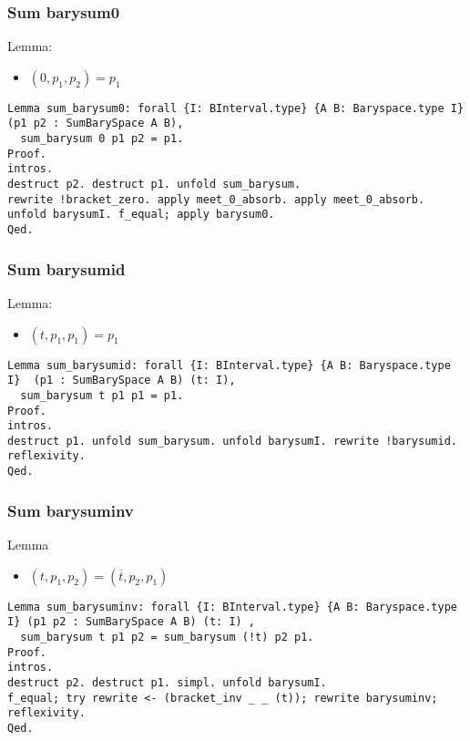 \documentclass[a4paper,10pt]{article} %
\begin{document}
\subsubsection{Sum barysum0}
Lemma:
\begin{itemize}
    \item $(0, p_1, p_2) = p_1$
\end{itemize}
\begin{lstlisting}
Lemma sum_barysum0: forall {I: BInterval.type} {A B: Baryspace.type I} (p1 p2 : SumBarySpace A B),
  sum_barysum 0 p1 p2 = p1.
Proof.
intros.
destruct p2. destruct p1. unfold sum_barysum. 
rewrite !bracket_zero. apply meet_0_absorb. apply meet_0_absorb. 
unfold barysumI. f_equal; apply barysum0. 
Qed.
\end{lstlisting}

\subsubsection{Sum barysumid}
Lemma:
\begin{itemize}
    \item $(t, p_1, p_1) = p_1$
\end{itemize}
\begin{lstlisting}
Lemma sum_barysumid: forall {I: BInterval.type} {A B: Baryspace.type I}  (p1 : SumBarySpace A B) (t: I),
  sum_barysum t p1 p1 = p1.
Proof.
intros.
destruct p1. unfold sum_barysum. unfold barysumI. rewrite !barysumid. reflexivity.
Qed.
\end{lstlisting}

\subsubsection{Sum barysuminv}
Lemma
\begin{itemize}
    \item $(t, p_1, p_2) = (\overline{t}, p_2, p_1)$
\end{itemize}
\begin{lstlisting}
Lemma sum_barysuminv: forall {I: BInterval.type} {A B: Baryspace.type I} (p1 p2 : SumBarySpace A B) (t: I) ,
  sum_barysum t p1 p2 = sum_barysum (!t) p2 p1.
Proof.
intros.
destruct p2. destruct p1. simpl. unfold barysumI. 
f_equal; try rewrite <- (bracket_inv _ _ (t)); rewrite barysuminv; reflexivity.
Qed.
\end{lstlisting}
\end{document}
